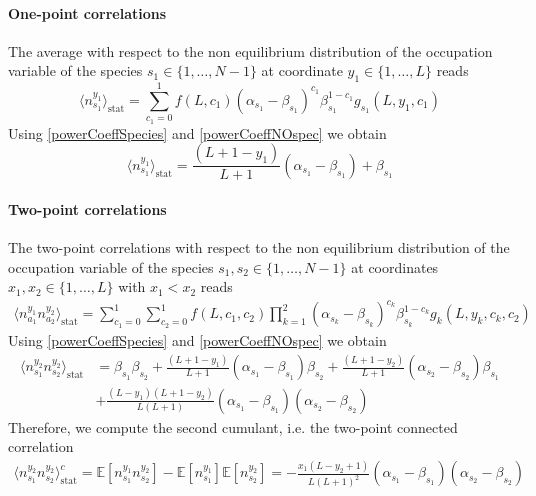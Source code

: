 \documentclass[10pt]{article}
\numberwithin{equation}{section}
\numberwithin{equation}{subsection}
\begin{document}
\paragraph{One-point correlations}
The average with respect to the non equilibrium distribution of the occupation variable of the species $s_{1}\in \{1,\ldots,N-1\}$ at coordinate $y_{1}\in \{1,\ldots,L\}$ reads
\begin{equation}
	\langle n_{s_{1}}^{y_{1}}\rangle_{\text{stat}}=\sum_{c_{1}=0}^{1}f(L,c_{1})(\alpha_{s_{1}}-\beta_{s_{1}})^{c_{1}}\beta_{s_{1}}^{1-c_{1}}g_{s_{1}}(L,y_{1},c_{1})
\end{equation}
Using \eqref{powerCoeffSpecies} and \eqref{powerCoeffNOspec} we obtain 
\begin{equation}\label{one-pts-corr}
\langle n_{s_{1}}^{y_{1}}\rangle_{\text{stat}}=\frac{(L+1-y_{1})}{L+1}(\alpha_{s_{1}}-\beta_{s_{1}})+\beta_{s_{1}}
\end{equation}
\paragraph{Two-point correlations}
The two-point correlations with respect to the non equilibrium distribution of the occupation variable of the species $s_{1},s_{2}\in \{1,\ldots,N-1\}$ at coordinates $x_{1},x_{2}\in \{1,\ldots,L\}$ with $x_{1}< x_{2}$ reads 
\begin{equation}
	\begin{split}
	\langle n_{a_{1}}^{y_{1}}n_{a_{2}}^{y_{2}}\rangle_{\text{stat}}= \sum_{c_{1}=0}^{1}\sum_{c_{2}=0}^{1}f(L,c_{1},c_{2})\prod_{k=1}^{2}(\alpha_{s_{k}}-\beta_{s_{k}})^{c_{k}}\beta_{s_{k}}^{1-c_{k}}g_{k}(L,y_{k},c_{k},c_{2})
	\end{split}
\end{equation}
Using \eqref{powerCoeffSpecies} and \eqref{powerCoeffNOspec} we obtain 
\begin{equation}
	\begin{split}
	\langle n_{s_{1}}^{y_{2}} n_{s_{2}}^{y_{2}}\rangle_{\text{stat}}&=\beta_{s_{1}}\beta_{s_{2}}+\frac{(L+1-y_{1})}{L+1}(\alpha_{s_{1}}-\beta_{s_{1}})\beta_{s_{2}}+\frac{(L+1-y_{2})}{L+1}(\alpha_{s_{2}}-\beta_{s_{2}})\beta_{s_{1}}\\&+\frac{(L-y_{1})(L+1-y_{2})}{L(L+1)}(\alpha_{s_{1}}-\beta_{s_{1}})(\alpha_{s_{2}}-\beta_{s_{2}})
	\end{split}
\end{equation}
Therefore, we compute the second cumulant, i.e. the two-point connected correlation
\begin{equation}\label{two-pts-corr}
	\begin{split}
		\langle n_{s_{1}}^{y_{2}} n_{s_{2}}^{y_{2}}\rangle_{\text{stat}}^{c}=\mathbb{E}[n_{s_{1}}^{y_{1}}n_{s_{2}}^{y_{2}}]-\mathbb{E}[n_{s_{1}}^{y_{1}}]\mathbb{E}[n_{s_{2}}^{y_{2}}]=-\frac{x_{1}(L-y_{2}+1)}{L(L+1)^{2}}\left(\alpha_{s_{1}}-\beta_{s_{1}}\right)\left(\alpha_{s_{2}}-\beta_{s_{2}}\right)
	\end{split}
\end{equation}
\end{document}
